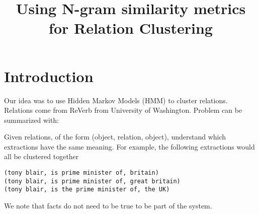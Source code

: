 \documentclass{article}
\begin{document}
\sloppy

\def\x{{\mathbf x}}
\def\L{{\cal L}}


\title{Using N-gram similarity metrics for Relation Clustering}
%

\address{
\textit{mayhewsw@rose-hulman.edu}\\
\textit{kampernj@rose-hulman.edu}\\
Rose-Hulman Institute of Technology}


\maketitle
\thispagestyle{fancy} \fancyhead{} \lhead{}
 \cfoot{}
\renewcommand{\headrulewidth}{0pt}
\renewcommand{\footrulewidth}{0pt}


%
%
%
\section{Introduction}
\label{sec:intro}

Our idea was to use Hidden Markov Models (HMM) to cluster relations.
Relations come from ReVerb from University of Washington. 
Problem can be summarized with:

Given relations, of the form (object, relation, object), understand which extractions have the same meaning. For example, the following extractions would all be clustered together

\begin{verbatim}
(tony blair, is prime minister of, britain) 
(tony blair, is prime minister of, great britain) 
(tony blair, is the prime minister of, the UK)
\end{verbatim}

We note that facts do not need to be true to be part of the system.
\end{document}
